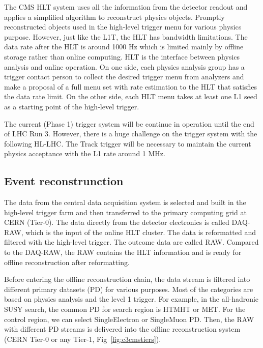 The CMS HLT system uses all the information from the detector readout and applies a simplified algorithm to reconstruct physics objects. Promptly reconstructed objects used in the high-level trigger menu for various physics purpose. However, just like the L1T, the HLT has bandwidth limitations. The data rate after the HLT is around 1000 Hz which is limited mainly by offline storage rather than online computing. HLT is the interface between physics analysis and online operation. On one side, each physics analysis group has a trigger contact person to collect the desired trigger menu from analyzers and make a proposal of a full menu set with rate estimation to the HLT that satisfies the data rate limit. On the other side, each HLT menu takes at least one L1 seed as a starting point of the high-level trigger.

The current (Phase 1) trigger system will be continue in operation until the end of LHC Run 3. However, there is a huge challenge on the trigger system with the following HL-LHC. The Track trigger will be necessary to maintain the current physics acceptance with the L1 rate around 1 MHz. 

\clearpage
\subsection{Event reconstrunction}

The data from the central data acquisition system is selected and built in the high-level trigger farm and then transferred to the primary computing grid at CERN (Tier-0). The data directly from the detector electronics is called DAQ-RAW, which is the input of the online HLT cluster. The data is reformatted and filtered with the high-level trigger. The outcome data are called RAW. Compared to the DAQ-RAW, the RAW contains the HLT information and is ready for offline reconstruction after reformatting. 

Before entering the offline reconstruction chain, the data stream is filtered into different primary datasets (PD) for various purposes. Most of the categories are based on physics analysis and the level 1 trigger. For example, in the all-hadronic SUSY search, the common PD for search region is HTMHT or MET. For the control region, we can select SingleElectron or SingleMuon PD. Then, the RAW with different PD streams is delivered into the offline reconstruction system (CERN Tier-0 or any Tier-1, Fig~\ref{fig:c3cmstiers}). 

